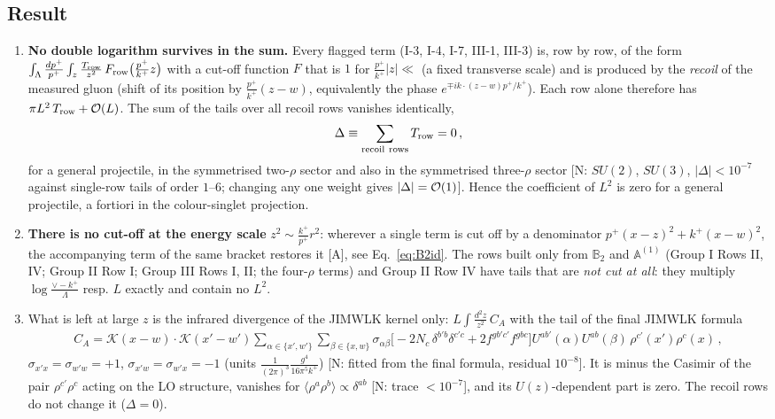\documentclass[9pt]{article}
\def\mf#1{\mathbb{#1}}
\numberwithin{equation}{section}
\begin{document}
\subsection{Result}
\begin{enumerate}
\item \textbf{No double logarithm survives in the sum.} Every flagged term (I-3, I-4, I-7, III-1, III-3) is, row by row, of the form $\int_{\Lambda}\frac{dp^{+}}{p^{+}}\int_{z}\frac{T_{\rm row}}{z^{2}}\,F_{\rm row}\big(\tfrac{p^{+}}{k^{+}}z\big)$ with a cut-off function $F$ that is $1$ for $\frac{p^{+}}{k^{+}}|z|\ll$ (a fixed transverse scale) and is produced by the \emph{recoil} of the measured gluon (shift of its position by $\frac{p^{+}}{k^{+}}(z-w)$, equivalently the phase $e^{\mp ik\cdot(z-w)p^{+}/k^{+}}$). Each row alone therefore has $\pi L^{2}\,T_{\rm row}+{\cal O}(L)$. The sum of the tails over all recoil rows vanishes identically,
\begin{align}
\Delta\equiv\sum_{\rm recoil\ rows}T_{\rm row}=0\,,
\end{align}
for a general projectile, in the symmetrised two-$\rho$ sector and also in the symmetrised three-$\rho$ sector [N: $SU(2)$, $SU(3)$, $|\Delta|<10^{-7}$ against single-row tails of order $1$--$6$; changing any one weight gives $|\Delta|={\cal O}(1)$]. Hence the coefficient of $L^{2}$ is zero for a general projectile, a fortiori in the colour-singlet projection.
\item \textbf{There is no cut-off at the energy scale} $z^{2}\sim\frac{k^{+}}{p^{+}}r^{2}$: wherever a single term is cut off by a denominator $p^{+}(x-z)^{2}+k^{+}(x-w)^{2}$, the accompanying term of the same bracket restores it [A], see Eq.~\eqref{eq:B2id}. The rows built only from $\mf{B}_{2}$ and $\mf{A}^{(1)}$ (Group I Rows II, IV; Group II Row I; Group III Rows I, II; the four-$\rho$ terms) and Group II Row IV have tails that are \emph{not cut at all}: they multiply $\log\frac{\vee-k^{+}}{\Lambda}$ resp. $L$ exactly and contain no $L^{2}$.
\item What is left at large $z$ is the infrared divergence of the JIMWLK kernel only: $L\int\frac{d^{2}z}{z^{2}}\,C_{A}$ with the tail of the final JIMWLK formula
\begin{align}
C_{A}=\mathcal{K}(x-w)\cdot\mathcal{K}(x'-w')\sum_{\alpha\in\{x',w'\}}\sum_{\beta\in\{x,w\}}\sigma_{\alpha\beta}\Big[-2N_{c}\,\delta^{b'b}\delta^{c'c}+2f^{gb'c'}f^{gbc}\Big]U^{ab'}(\alpha)U^{ab}(\beta)\,\rho^{c'}(x')\rho^{c}(x)\,,
\end{align}
$\sigma_{x'x}=\sigma_{w'w}=+1$, $\sigma_{x'w}=\sigma_{w'x}=-1$ (units $\frac{1}{(2\pi)^{3}}\frac{g^{4}}{16\pi^{5}k^{+}}$) [N: fitted from the final formula, residual $10^{-8}$]. It is minus the Casimir of the pair $\rho^{c'}\rho^{c}$ acting on the LO structure, vanishes for $\langle\rho^{a}\rho^{b}\rangle\propto\delta^{ab}$ [N: trace $<10^{-7}$], and its $U(z)$-dependent part is zero. The recoil rows do not change it ($\Delta=0$).
\end{enumerate}
\end{document}
